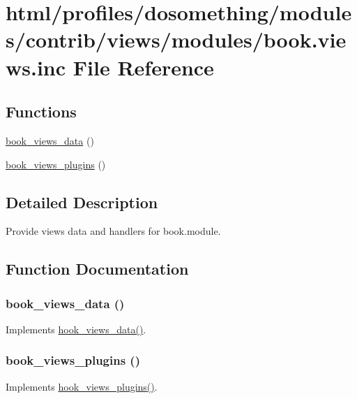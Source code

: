 \hypertarget{book_8views_8inc}{
\section{html/profiles/dosomething/modules/contrib/views/modules/book.views.inc File Reference}
\label{book_8views_8inc}
}
\subsection*{Functions}
\begin{DoxyCompactItemize}
\item 
\hyperlink{book_8views_8inc_af22995b80b019a7b00c8455590690c6f}{book\_\-views\_\-data} ()
\item 
\hyperlink{book_8views_8inc_adbe9780348b1d92897977066411e6d59}{book\_\-views\_\-plugins} ()
\end{DoxyCompactItemize}


\subsection{Detailed Description}
Provide views data and handlers for book.module. 

\subsection{Function Documentation}
\hypertarget{book_8views_8inc_af22995b80b019a7b00c8455590690c6f}{
\subsubsection[{book\_\-views\_\-data}]{\setlength{\rightskip}{0pt plus 5cm}book\_\-views\_\-data ()}}
\label{book_8views_8inc_af22995b80b019a7b00c8455590690c6f}
Implements \hyperlink{group__views__hooks_ga227057901681e4a33e33c199c7a8c989}{hook\_\-views\_\-data()}. \hypertarget{book_8views_8inc_adbe9780348b1d92897977066411e6d59}{
\subsubsection[{book\_\-views\_\-plugins}]{\setlength{\rightskip}{0pt plus 5cm}book\_\-views\_\-plugins ()}}
\label{book_8views_8inc_adbe9780348b1d92897977066411e6d59}
Implements \hyperlink{group__views__hooks_ga23f6e9972b2ed84fc54b7ff63f44477d}{hook\_\-views\_\-plugins()}. 